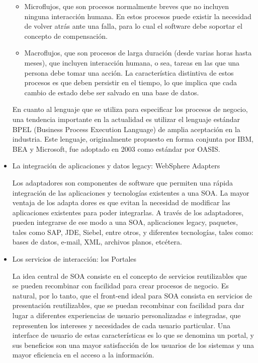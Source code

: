 \begin{itemize}
\begin{itemize}
\item Microflujos, que son procesos normalmente breves que no incluyen ninguna interacción humana. En estos procesos puede existir la necesidad de volver atrás ante una falla, para lo cual el software debe soportar el concepto de compensación. 
\item Macroflujos, que son procesos de larga duración (desde varias horas hasta meses), que incluyen interacción humana, o sea, tareas en las que una persona debe tomar una acción. La característica distintiva de estos procesos es que deben persistir en el tiempo, lo que implica que cada cambio de estado debe ser salvado en una base de datos.
\end{itemize}

En cuanto al lenguaje que se utiliza para especificar los procesos de negocio, una tendencia importante en la actualidad es utilizar el lenguaje estándar BPEL (Business Process Execution Language) de amplia aceptación en la industria. Este lenguaje, originalmente propuesto en forma conjunta por IBM, BEA y Microsoft, fue adoptado en 2003 como estándar por OASIS.

\item La integración de aplicaciones y datos legacy: WebSphere Adapters
 
Los adaptadores son componentes de software que permiten una rápida integración de las aplicaciones y tecnologías existentes a una SOA. La mayor ventaja de los adapta dores es que evitan la necesidad de modificar las aplicaciones existentes para poder integrarlas. A través de los adaptadores, pueden integrarse de ese modo a una SOA, aplicaciones legacy, paquetes, tales como SAP, JDE, Siebel, entre otros, y diferentes tecnologías, tales como: bases de datos, e-mail, XML, archivos planos, etcétera.

\item  Los servicios de interacción: los Portales 

La idea central de SOA consiste en el concepto de servicios reutilizables que se pueden recombinar con facilidad para crear procesos de negocio. Es natural, por lo tanto, que el front-end ideal para SOA consista en servicios de presentación reutilizables, que se puedan recombinar con facilidad para dar lugar a diferentes experiencias de usuario personalizadas e integradas, que representen los intereses y necesidades de cada usuario particular. Una interface de usuario de estas características es lo que se denomina un portal, y sus beneficios son una mayor satisfacción de los usuarios de los sistemas y una mayor eficiencia en el acceso a la información.\cite{WEB4} 
\end{itemize}

